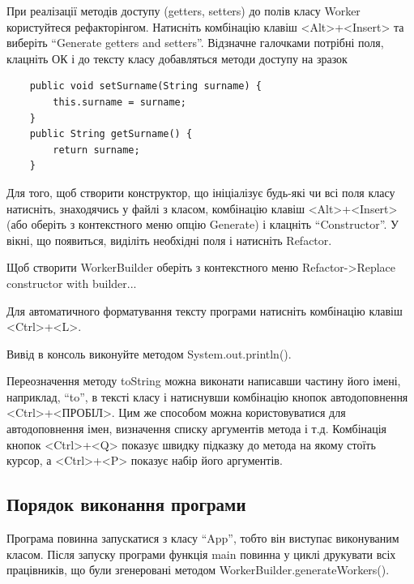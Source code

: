  При реалізації методів доступу (getters, setters) до  полів класу Worker користуйтеся  рефакторінгом. Натисніть комбінацію клавіш <Alt>+<Insert> та виберіть ``Generate getters and setters''.
Відзначне галочками потрібні поля, клацніть ОК і до тексту класу добавляться методи доступу на зразок
\begin{lstlisting}
    public void setSurname(String surname) {
        this.surname = surname;
    }
    public String getSurname() {
        return surname;
    }
\end{lstlisting}

Для того, щоб створити конструктор, що ініціалізує будь-які чи всі поля класу натисніть, знаходячись у файлі з класом, комбінацію клавіш <Alt>+<Insert> (або оберіть з контекстного меню опцію Generate) і клацніть ``Constructor''. У вікні, що появиться, виділіть необхідні поля і натисніть Refactor.

Щоб створити WorkerBuilder оберіть з контекстного меню Refactor->Replace constructor with builder...


Для автоматичного форматування тексту програми  натисніть комбінацію клавіш <Ctrl>+<L>. 

Вивід в консоль виконуйте методом System.out.println().

Переозначення методу toString можна виконати написавши частину його імені, наприклад, ``to'', в тексті класу і натиснувши комбінацію кнопок автодоповнення <Ctrl>+<ПРОБІЛ>. Цим же способом можна користовуватися для автодоповнення імен, визначення списку аргументів метода і т.д. Комбінація кнопок <Ctrl>+<Q> показує швидку підказку до метода на якому стоїть курсор, а <Ctrl>+<P> показує набір його аргументів.

\subsection{Порядок виконання програми}
Програма повинна запускатися з класу ``App'', тобто він виступає виконуваним класом. Після запуску програми функція main повинна у циклі друкувати всіх працівників, що були згенеровані методом WorkerBuilder.generateWorkers(). 

